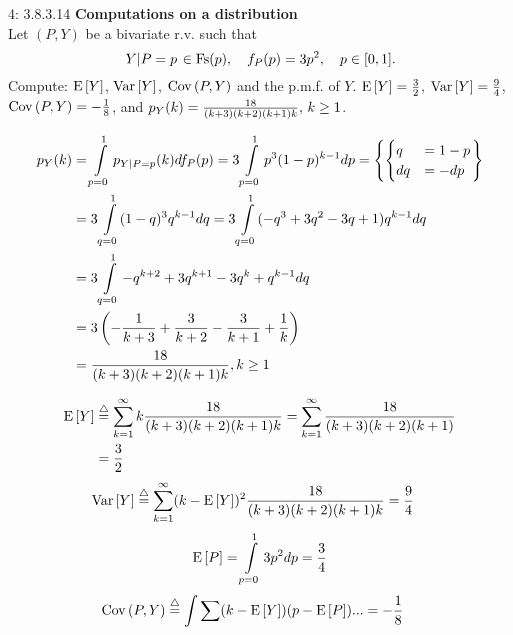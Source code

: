 \documentclass[a4paper,twoside=false,abstract=false,numbers=noenddot,
titlepage=false,headings=small,parskip=half,version=last]{scrartcl}
\begin{document}
\begin{exercise}{4: 3.8.3.14} \textbf{Computations on a distribution} \\
    Let $(P,Y)$ be a bivariate r.v. such that
    \begin{equation}
        \left. Y \middle\vert P=p \right. \in \text{Fs}(p),\quad
        f_P(p)=3p^2,\quad
        p\in [0, 1].
    \end{equation}
    Compute: ${\rm E}\,[Y]$, ${\rm Var}\,[Y]$, ${\rm Cov}\,(P, Y)$ and the p.m.f.
    of $Y$.
    \Answer
    ${{\rm E}\,[Y]=\frac{3}{2}}$,
    ${{\rm Var}\,[Y]=\frac{9}{4}}$,
    ${{\rm Cov}\,(P,Y)=-\frac{1}{8}}$, and
    $p_{Y} (k) = \frac{18}{(k+3)(k+2)(k+1)k},\, k \ge 1$.

\end{exercise}
\begin{solution}

    \begin{align}
        p_{Y} (k) &= \int\limits_{p=0}^1 p_{Y|P=p} (k) df_P(p) =
        3\int\limits_{p=0}^1 p^3 (1-p)^{k-1}dp = \left\{
            \begin{cases}
                q   & = 1-p \\
                dq  & = -dp
            \end{cases}
        \right\} \nonumber \\ & =
        3\int\limits_{q=0}^1 (1-q)^3 q^{k-1} dq =
        3\int\limits_{q=0}^1 (-q^3+3 q^2-3 q+1) q^{k-1} dq \nonumber \\ & =
        3\int\limits_{q=0}^1 -q^{k+2}+3q^{k+1}-3q^k+q^{k-1} dq \nonumber \\ & =
        3\left(-\frac{1}{k+3}+\frac{3}{k+2}-\frac{3}{k+1}+\frac{1}{k}\right) \nonumber \\ & =
        \frac{18}{(k+3)(k+2)(k+1)k}, k \ge 1
    \end{align} %

    \begin{align}
        \Expected[Y] & \eqdef \sum\limits_{k=1}^\infty k
        \frac{18}{(k+3)(k+2)(k+1)k} =
        \sum\limits_{k=1}^\infty \frac{18}{(k+3)(k+2)(k+1)} \nonumber \\ & =
        \frac{3}{2}
    \end{align}
    \begin{align}
        \Variance[Y] & \eqdef \sum\limits_{k=1}^\infty (k - \Expected[Y])^2
        \frac{18}{(k+3)(k+2)(k+1)k} =
        \frac{9}{4}
    \end{align}
    \begin{equation}
        {\rm E}\,[P] = \int\limits_{p=0}^1 3p^2dp = \frac{3}{4}
    \end{equation}
    \begin{align}
        \CoVariance(P, Y) & \eqdef \int\sum
            (k - \Expected[Y])(p - \Expected[P])
        ... =
        -\frac{1}{8}
    \end{align}



\end{solution}
\pagebreak
\end{document}
